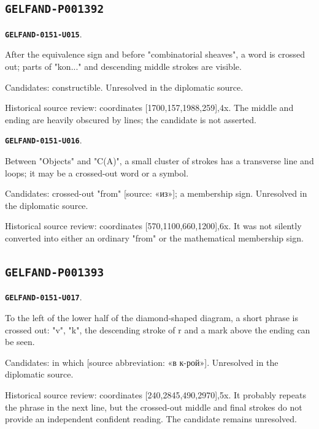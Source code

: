 \documentclass[11pt]{article}
\theoremstyle{definition}
\theoremstyle{remark}
\begin{document}
\subsection*{\texttt{GELFAND-P001392}}
\par\noindent\leavevmode{}\label{GELFAND-0151-U015}\label{GELFAND-P001392:cancelled-equivalence:note}\textbf{\texttt{GELFAND-0151-U015}}.\nopagebreak[4]\par
After the equivalence sign and before "combinatorial sheaves", a word is crossed out; parts of "kon..." and descending middle strokes are visible.\par
Candidates: constructible. Unresolved in the diplomatic source.\par
Historical source review: coordinates [1700,157,1988,259],4x. The middle and ending are heavily obscured by lines; the candidate is not asserted.\par\medskip
\par\noindent\leavevmode{}\label{GELFAND-0151-U016}\label{GELFAND-P001392:objects-mark:note}\textbf{\texttt{GELFAND-0151-U016}}.\nopagebreak[4]\par
Between "Objects" and "C(A)", a small cluster of strokes has a transverse line and loops; it may be a crossed-out word or a symbol.\par
Candidates: crossed-out "from" [source: «из»]; a membership sign. Unresolved in the diplomatic source.\par
Historical source review: coordinates [570,1100,660,1200],6x. It was not silently converted into either an ordinary "from" or the mathematical membership sign.\par\medskip
\subsection*{\texttt{GELFAND-P001393}}
\par\noindent\leavevmode{}\label{GELFAND-0151-U017}\label{GELFAND-P001393:cancelled-left:note}\textbf{\texttt{GELFAND-0151-U017}}.\nopagebreak[4]\par
To the left of the lower half of the diamond-shaped diagram, a short phrase is crossed out: "v", "k", the descending stroke of r and a mark above the ending can be seen.\par
Candidates: in which [source abbreviation: «в к-рой»]. Unresolved in the diplomatic source.\par
Historical source review: coordinates [240,2845,490,2970],5x. It probably repeats the phrase in the next line, but the crossed-out middle and final strokes do not provide an independent confident reading. The candidate remains unresolved.\par\medskip
\end{document}
